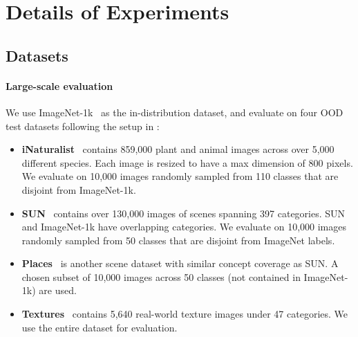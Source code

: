 \documentclass{article}
\begin{document}
\section{Details of Experiments}
\label{app:exp_detail}

\subsection{Datasets}
\label{app:dataset}
\paragraph{Large-scale evaluation} We use ImageNet-1k~\cite{deng2009imagenet} as the in-distribution dataset, and evaluate on four OOD test datasets following the setup in \cite{huang2021mos}:
\begin{itemize}
    \item \textbf{iNaturalist}~\cite{van2018inaturalist} contains 859,000 plant and animal images across over 5,000 different species. Each image is resized to have a max dimension of 800 pixels. We evaluate on 10,000 images randomly sampled from 110 classes that are disjoint from ImageNet-1k.
    \vspace{-0.1cm}
    \item \textbf{SUN}~\cite{xiao2010sun} contains over 130,000 images of scenes spanning 397 categories. SUN and ImageNet-1k have overlapping categories. We evaluate on 10,000 images randomly sampled from 50 classes that are disjoint from ImageNet labels.
    \vspace{-0.1cm}
    \item \textbf{Places}~\cite{zhou2017places} is another scene dataset with similar concept coverage as SUN. A chosen subset of 10,000 images across 50 classes (not contained in ImageNet-1k) are used.
    \vspace{-0.1cm}
    \item \textbf{Textures}~\cite{cimpoi14describing} contains 5,640 real-world texture images under 47 categories. We use the entire dataset for evaluation.
\end{itemize}
\end{document}
